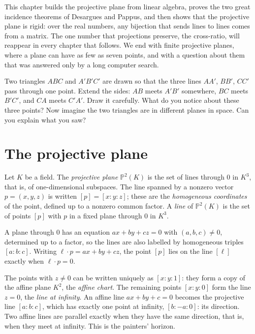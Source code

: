 This chapter builds the projective plane from linear algebra, proves the two great incidence theorems of Desargues and Pappus, and then shows
that the projective plane is rigid: over the real numbers, any bijection that sends lines to lines comes from a matrix. The one number that
projections preserve, the cross-ratio, will reappear in every chapter that follows. We end with finite projective planes, where a plane can have
as few as seven points, and with a question about them that was answered only by a long computer search.

\begin{think}
Two triangles $ABC$ and $A'B'C'$ are drawn so that the three lines $AA'$, $BB'$, $CC'$ pass through one point. Extend the sides: $AB$ meets
$A'B'$ somewhere, $BC$ meets $B'C'$, and $CA$ meets $C'A'$. Draw it carefully. What do you notice about these three points? Now imagine the two
triangles are in different planes in space. Can you explain what you saw?
\end{think}

\section{The projective plane}

\begin{definition}\label{geometry:def:projplane}
Let $K$ be a field. The \emph{projective plane} $\mathbb P^2(K)$ is the set of lines through $0$ in $K^3$, that is, of one-dimensional subspaces.
The line spanned by a nonzero vector $p=(x,y,z)$ is written $[p]=[x:y:z]$; these are the \emph{homogeneous coordinates} of the point, defined up
to a nonzero common factor. A \emph{line} of $\mathbb P^2(K)$ is the set of points $[p]$ with $p$ in a fixed plane through $0$ in $K^3$.
\end{definition}

A plane through $0$ has an equation $ax+by+cz=0$ with $(a,b,c)\ne0$, determined up to a factor, so the lines are also labelled by homogeneous
triples $[a:b:c]$. Writing $\ell\cdot p=ax+by+cz$, the point $[p]$ lies on the line $[\ell]$ exactly when $\ell\cdot p=0$.

The points with $z\ne0$ can be written uniquely as $[x:y:1]$: they form a copy of the affine plane $K^2$, the \emph{affine chart}. The
remaining points $[x:y:0]$ form the line $z=0$, the \emph{line at infinity}. An affine line $ax+by+c=0$ becomes the projective line $[a:b:c]$,
which has exactly one point at infinity, $[b:-a:0]$: its direction. Two affine lines are parallel exactly when they have the same direction, that
is, when they meet at infinity. This is the painters' horizon.

